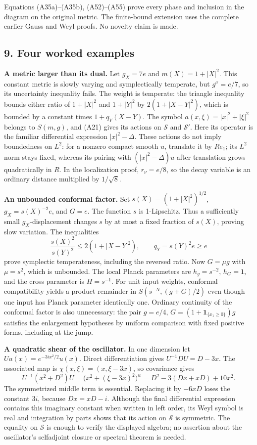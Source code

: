 \documentclass[
  11pt,
]{article}
\begin{document}
Equations (A35a)--(A35b), (A52)--(A55) prove every phase and inclusion
in the diagram on the original metric. The finite-bound extension uses
the complete earlier Gauss and Weyl proofs. No novelty claim is made.

\subsection{9. Four worked examples}\label{four-worked-examples}

\textbf{A metric larger than its dual.} Let \(g_X=7e\) and
\(m(X)=1+|X|^2\). This constant metric is slowly varying and
symplectically temperate, but \(g^\sigma=e/7\), so its uncertainty
inequality fails. The weight is temperate: the triangle inequality
bounds either ratio of \(1+|X|^2\) and \(1+|Y|^2\) by \(2(1+|X-Y|^2)\),
which is bounded by a constant times \(1+q_Y(X-Y)\). The symbol
\(a(x,\xi)=|x|^2+|\xi|^2\) belongs to \(S(m,g)\), and (A21) gives its
actions on \(\mathcal S\) and \(\mathcal S'\). Here its operator is the
familiar differential expression \(|x|^2-\Delta\). These actions do not
imply boundedness on \(L^2\): for a nonzero compact smooth \(u\),
translate it by \(Re_1\); its \(L^2\) norm stays fixed, whereas its
pairing with \((|x|^2-\Delta)u\) after translation grows quadratically
in \(R\). In the localization proof, \(r_\nu=e/8\), so the decay
variable is an ordinary distance multiplied by \(1/\sqrt8\).

\textbf{An unbounded conformal factor.} Set \(s(X)=(1+|X|^2)^{1/2}\),
\(g_X=s(X)^{-2}e\), and \(G=e\). The function \(s\) is 1-Lipschitz. Thus
a sufficiently small \(g_X\)-displacement changes \(s\) by at most a
fixed fraction of \(s(X)\), proving slow variation. The inequalities \[
\frac{s(X)^2}{s(Y)^2}\le 2(1+|X-Y|^2),\qquad q_Y=s(Y)^2e\ge e
\tag{A47}
\] prove symplectic temperateness, including the reversed ratio. Now
\(G=\mu g\) with \(\mu=s^2\), which is unbounded. The local Planck
parameters are \(h_g=s^{-2}\), \(h_G=1\), and the cross parameter is
\(H=s^{-1}\). For unit input weights, conformal compatibility yields a
product remainder in \(S(s^{-N},(g+G)/2)\) even though one input has
Planck parameter identically one. Ordinary continuity of the conformal
factor is also unnecessary: the pair \(g=e/4\),
\(G=(1+\mathbf1_{\{x_1\ge0\}})g\) satisfies the enlargement hypotheses
by uniform comparison with fixed positive forms, including at the jump.

\textbf{A quadratic shear of the oscillator.} In one dimension let
\(Uu(x)=e^{-3ix^2/2}u(x)\). Direct differentiation gives
\(U^{-1}DU=D-3x\). The associated map is \(\chi(x,\xi)=(x,\xi-3x)\), so
covariance gives \[
U^{-1}(x^2+D^2)U
=\big(x^2+(\xi-3x)^2\big)^w
=D^2-3(Dx+xD)+10x^2.
\tag{A48}
\] The symmetrized middle term is essential. Replacing it by \(-6xD\)
loses the constant \(3i\), because \(Dx=xD-i\). Although the final
differential expression contains this imaginary constant when written in
left order, its Weyl symbol is real and integration by parts shows that
its action on \(\mathcal S\) is symmetric. The equality on
\(\mathcal S\) is enough to verify the displayed algebra; no assertion
about the oscillator's selfadjoint closure or spectral theorem is
needed.
\end{document}
